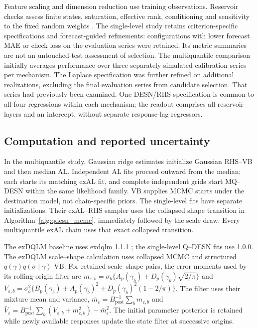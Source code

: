 \documentclass[12pt,letterpaper]{article}
\newcommand{\pkg}[1]{\textsf{#1}}
\numberwithin{suppalgorithm}{section}
\numberwithin{equation}{section}
\numberwithin{table}{section}
\numberwithin{figure}{section}
\begin{document}
Feature scaling and dimension reduction use training observations.
Reservoir checks assess finite states, saturation, effective rank,
conditioning and sensitivity to the fixed random weights
\citep{JaegerLukoseviciusPopoviciSiewert2007LeakyESN,YildizJaegerKiebel2012ESP}.
The single-level study retains criterion-specific specifications and
forecast-guided refinements: configurations with lower forecast
MAE or check loss on the evaluation series were retained. Its metric
summaries are not an untouched-test assessment of selection.
The multiquantile comparison initially averages performance over three
separately simulated calibration series per mechanism. The Laplace
specification was further refined on additional realizations, excluding
the final evaluation series from candidate selection. That series had
previously been examined. One DESN/RHS specification is common to all
four regressions within each mechanism; the readout comprises all reservoir
layers and an intercept, without separate response-lag regressors.

\subsection{Computation and reported uncertainty}
\label{subsec:supp-independent-metrics}
\label{subsec:supp-independent-exal-mcmc-details}
\label{subsec:supp-mq-computation}

In the multiquantile study, Gaussian ridge estimates initialize Gaussian
RHS--VB and then median AL. Independent AL fits proceed outward from the
median; each starts its matching exAL fit, and complete independent grids
start MQ--DESN within the same likelihood family. VB supplies MCMC starts
under the destination model, not chain-specific priors. The
single-level fits have separate initializations. Their exAL--RHS sampler
uses the collapsed shape transition in Algorithm~\ref{alg:qdesn_mcmc},
immediately followed by the scale draw. Every multiquantile exAL chain uses
that exact collapsed transition.

The exDQLM baseline uses \pkg{exdqlm} 1.1.1
\citep{DeLeonEtAl2026Exdqlm}; the single-level Q--DESN fits use 1.0.0.
The exDQLM scale--shape calculation uses collapsed
MCMC and structured \(q(\gamma)q(\sigma\mid\gamma)\) VB. For retained
scale--shape pairs, the error moments used by its rolling-origin filter are
\(m_{\varepsilon,b}=\sigma_b\{A_p(\gamma_b)+D_p(\gamma_b)\sqrt{2/\pi}\}\)
and \(V_{\varepsilon,b}=\sigma_b^2\{B_p(\gamma_b)+A_p(\gamma_b)^2+
D_p(\gamma_b)^2(1-2/\pi)\}\).
The filter uses their mixture mean and variance,
\(\bar m_\varepsilon=B_{\mathrm{post}}^{-1}\sum_bm_{\varepsilon,b}\)
and \(\bar V_\varepsilon=B_{\mathrm{post}}^{-1}
\sum_b(V_{\varepsilon,b}+m_{\varepsilon,b}^2)-\bar m_\varepsilon^2\).
The initial parameter posterior is retained while newly available responses
update the state filter at successive origins.
\end{document}
